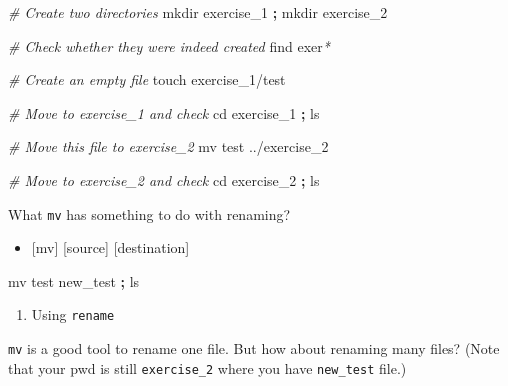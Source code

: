 \documentclass[
]{book}
\newenvironment{Shaded}{\begin{snugshade}}{\end{snugshade}}
\newcommand{\BuiltInTok}[1]{#1}
\newcommand{\CommentTok}[1]{\textcolor[rgb]{0.56,0.35,0.01}{\textit{#1}}}
\newcommand{\ControlFlowTok}[1]{\textcolor[rgb]{0.13,0.29,0.53}{\textbf{#1}}}
\newcommand{\FunctionTok}[1]{\textcolor[rgb]{0.00,0.00,0.00}{#1}}
\newcommand{\KeywordTok}[1]{\textcolor[rgb]{0.13,0.29,0.53}{\textbf{#1}}}
\newcommand{\NormalTok}[1]{#1}
\newcommand{\PreprocessorTok}[1]{\textcolor[rgb]{0.56,0.35,0.01}{\textit{#1}}}
\newcommand{\StringTok}[1]{\textcolor[rgb]{0.31,0.60,0.02}{#1}}
\newcommand{\VariableTok}[1]{\textcolor[rgb]{0.00,0.00,0.00}{#1}}
\providecommand{\tightlist}{%
  \setlength{\itemsep}{0pt}\setlength{\parskip}{0pt}}
\begin{document}
\begin{Shaded}
\begin{Highlighting}[]

\CommentTok{\# Create two directories }
\FunctionTok{mkdir}\NormalTok{ exercise\_1 }\KeywordTok{;} \FunctionTok{mkdir}\NormalTok{ exercise\_2 }

\CommentTok{\# Check whether they were indeed created }
\FunctionTok{find}\NormalTok{ exer}\PreprocessorTok{*}

\CommentTok{\# Create an empty file }
\FunctionTok{touch}\NormalTok{ exercise\_1/test }

\CommentTok{\# Move to exercise\_1 and check }
\BuiltInTok{cd}\NormalTok{ exercise\_1 }\KeywordTok{;} \FunctionTok{ls} 

\CommentTok{\# Move this file to exercise\_2 }
\FunctionTok{mv}\NormalTok{ test ../exercise\_2 }

\CommentTok{\# Move to exercise\_2 and check }
\BuiltInTok{cd}\NormalTok{ exercise\_2 }\KeywordTok{;} \FunctionTok{ls} 
\end{Highlighting}
\end{Shaded}

What \texttt{mv} has something to do with renaming?

\begin{itemize}
\tightlist
\item
  {[}mv{]} {[}source{]} {[}destination{]}
\end{itemize}

\begin{Shaded}
\begin{Highlighting}[]

\FunctionTok{mv}\NormalTok{ test new\_test }\KeywordTok{;} \FunctionTok{ls} 
\end{Highlighting}
\end{Shaded}

\begin{enumerate}
\def\labelenumi{\arabic{enumi}.}
\setcounter{enumi}{1}
\tightlist
\item
  Using \texttt{rename}
\end{enumerate}

\texttt{mv} is a good tool to rename one file. But how about renaming many files? (Note that your pwd is still \texttt{exercise\_2} where you have \texttt{new\_test} file.)

\begin{Shaded}
\end{Shaded}
\end{document}
